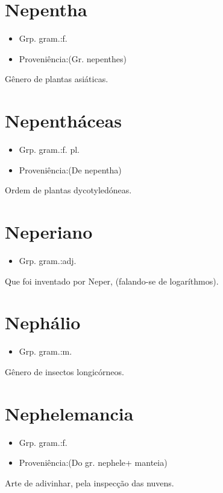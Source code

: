 \section{Nepentha}
\begin{itemize}
\item {Grp. gram.:f.}
\end{itemize}
\begin{itemize}
\item {Proveniência:(Gr. \textunderscore nepenthes\textunderscore )}
\end{itemize}
Gênero de plantas asiáticas.
\section{Nepentháceas}
\begin{itemize}
\item {Grp. gram.:f. pl.}
\end{itemize}
\begin{itemize}
\item {Proveniência:(De \textunderscore nepentha\textunderscore )}
\end{itemize}
Ordem de plantas dycotyledóneas.
\section{Neperiano}
\begin{itemize}
\item {Grp. gram.:adj.}
\end{itemize}
Que foi inventado por Neper, (falando-se de logaríthmos).
\section{Nephálio}
\begin{itemize}
\item {Grp. gram.:m.}
\end{itemize}
Gênero de insectos longicórneos.
\section{Nephelemancia}
\begin{itemize}
\item {Grp. gram.:f.}
\end{itemize}
\begin{itemize}
\item {Proveniência:(Do gr. \textunderscore nephele\textunderscore  + \textunderscore manteia\textunderscore )}
\end{itemize}
Arte de adivinhar, pela inspecção das nuvens.
